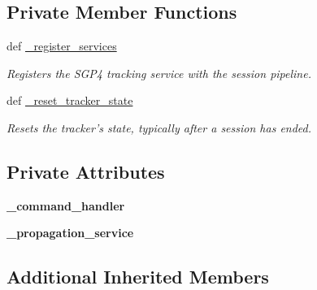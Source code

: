 \subsection*{Private Member Functions}
\begin{DoxyCompactItemize}
\item 
def \hyperlink{classhwm_1_1hardware_1_1devices_1_1drivers_1_1sgp4__tracker_1_1sgp4__tracker_1_1_s_g_p4___tracker_ae7daf5760ed527c79fe87b20df109b75}{\-\_\-register\-\_\-services}
\begin{DoxyCompactList}\small\item\em Registers the S\-G\-P4 tracking service with the session pipeline. \end{DoxyCompactList}\item 
def \hyperlink{classhwm_1_1hardware_1_1devices_1_1drivers_1_1sgp4__tracker_1_1sgp4__tracker_1_1_s_g_p4___tracker_a02d1edf5fed21f607ec503e2ef110c07}{\-\_\-reset\-\_\-tracker\-\_\-state}
\begin{DoxyCompactList}\small\item\em Resets the tracker's state, typically after a session has ended. \end{DoxyCompactList}\end{DoxyCompactItemize}
\subsection*{Private Attributes}
\begin{DoxyCompactItemize}
\item 
\hypertarget{classhwm_1_1hardware_1_1devices_1_1drivers_1_1sgp4__tracker_1_1sgp4__tracker_1_1_s_g_p4___tracker_aa4015de528549612b08e721964791d8b}{{\bfseries \-\_\-command\-\_\-handler}}\label{classhwm_1_1hardware_1_1devices_1_1drivers_1_1sgp4__tracker_1_1sgp4__tracker_1_1_s_g_p4___tracker_aa4015de528549612b08e721964791d8b}

\item 
\hypertarget{classhwm_1_1hardware_1_1devices_1_1drivers_1_1sgp4__tracker_1_1sgp4__tracker_1_1_s_g_p4___tracker_a5916c5728c756f6757e1f02f2e8a7091}{{\bfseries \-\_\-propagation\-\_\-service}}\label{classhwm_1_1hardware_1_1devices_1_1drivers_1_1sgp4__tracker_1_1sgp4__tracker_1_1_s_g_p4___tracker_a5916c5728c756f6757e1f02f2e8a7091}

\end{DoxyCompactItemize}
\subsection*{Additional Inherited Members}


